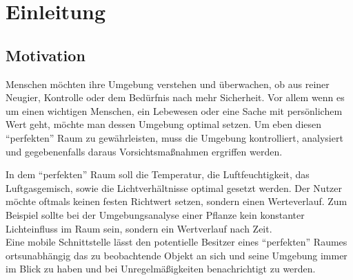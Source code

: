 \chapter{Einleitung}

\section{Motivation}
Menschen möchten ihre Umgebung verstehen und überwachen, ob aus reiner Neugier, Kontrolle oder dem Bedürfnis nach mehr Sicherheit. Vor allem wenn es um einen wichtigen Menschen, ein Lebewesen oder eine Sache mit persönlichem Wert geht, möchte man dessen Umgebung optimal setzen. Um eben diesen ``perfekten'' Raum zu gewährleisten, muss die Umgebung kontrolliert, analysiert und gegebenenfalls daraus Vorsichtsmaßnahmen ergriffen werden.

In dem ``perfekten'' Raum soll die Temperatur, die Luftfeuchtigkeit, das Luftgasgemisch, sowie die Lichtverhältnisse optimal gesetzt werden. Der Nutzer möchte oftmals keinen festen Richtwert setzen, sondern einen Werteverlauf. Zum Beispiel sollte bei der Umgebungsanalyse einer Pflanze kein konstanter Lichteinfluss im Raum sein, sondern ein Wertverlauf nach Zeit.\\
Eine mobile Schnittstelle lässt den potentielle Besitzer eines ``perfekten'' Raumes ortsunabhängig das zu beobachtende Objekt an sich und seine Umgebung immer im Blick zu haben und bei Unregelmäßigkeiten benachrichtigt zu werden.


